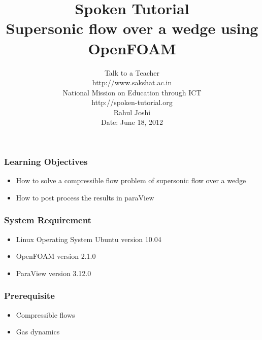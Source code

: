 \documentclass[17pt]{beamer}
\begin{document}
\sffamily \bfseries
\title
[Supersonic flow over a wedge
\hspace{0.44cm}
\insertframenumber/\inserttotalframenumber]
{\small Spoken Tutorial\\ \large Supersonic flow over a wedge using OpenFOAM}
\author
[Script: Arvind N , Narration: Rahul joshi]
{{\small Talk to a Teacher \\ \color{blue} http://www.sakshat.ac.in \\ \color {black} National Mission on Education
  through ICT \\ \color{blue} http://spoken-tutorial.org }\\
\normalsize Rahul Joshi\\ 
{\small Date: June 18, 2012}}


\begin{frame}
   \titlepage
\end{frame}

	 
\begin{frame}[<+-|alert@+>]
	
\transdissolve \frametitle{Learning Objectives}
 
\begin{itemize}
\item{How to solve a compressible flow problem of supersonic flow over a wedge }\pause 
\item{How to post process the results in paraView} 
\end{itemize}
\end{frame}


\begin{frame}
	
		\transdissolve \frametitle{System Requirement}
			
		\begin{itemize}[<+-|alert@+>]
			\item {Linux Operating System Ubuntu version 10.04} \pause
			\item {OpenFOAM version 2.1.0}\pause
\item {ParaView version 3.12.0}
\end{itemize}
	\end{frame}
	
	\begin{frame}
	
		\transdissolve \frametitle{Prerequisite}
			
		\begin{itemize}[<+-|alert@+>]
			\item {Compressible flows} \pause
			\item {Gas dynamics}
\end{itemize}
	\end{frame}
	
\end{document}
